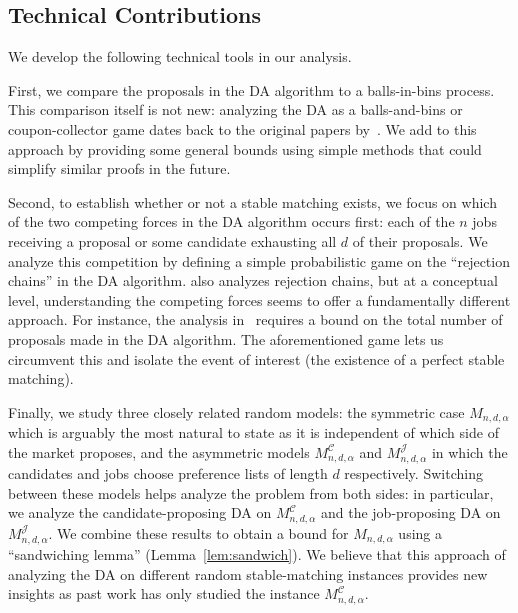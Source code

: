 \documentclass[11pt]{amsart}
\newcommand{\cal}[1]{\mathcal{#1}}
\begin{document}
\subsection{Technical Contributions} 
We develop the following technical tools in our analysis.  



 First, we compare the proposals in the DA algorithm to a balls-in-bins process. This comparison itself is not new: analyzing the DA as a balls-and-bins or coupon-collector game dates back to the original papers by~\cite{wilson1972analysis, knuth1976mariages}. We add to this approach by providing some general bounds using simple methods that could simplify similar proofs in the future.

 Second, to establish whether or not a stable matching exists, we focus on which of the two competing forces in the DA algorithm occurs first:  each of the $n$ jobs receiving a proposal or some candidate exhausting all $d$ of their proposals. We analyze this competition by defining a simple probabilistic game on the ``rejection chains'' in the DA algorithm. \cite{kanoria2021matching} also analyzes rejection chains, but at a conceptual level, understanding the competing forces seems to offer a fundamentally different approach. For instance, the analysis in~\cite{kanoria2021matching} requires a bound on the total number of proposals made in the DA algorithm. The aforementioned game lets us circumvent this and isolate the event of interest (the existence of a perfect stable matching).
 
 
Finally, we study three closely related random models: the symmetric case $M_{n, d, \alpha}$ which is arguably the most natural to state as it is independent of which side of the market proposes,  
 and the asymmetric models $M_{n, d, \alpha}^{\cal{C}}$ and $M_{n, d, \alpha}^{\cal{J}}$ in which the candidates and jobs choose preference lists of length $d$ respectively.  Switching between these models helps analyze the problem from both sides: in particular, we analyze the candidate-proposing DA on $M_{n, d, \alpha}^{\cal{C}}$ and the job-proposing DA on $M_{n, d, \alpha}^{\cal{J}}$.  We combine these results to obtain a bound for $M_{n, d, \alpha}$  using a ``sandwiching lemma'' (Lemma~\ref{lem:sandwich}).  We believe that this approach of analyzing the DA on different random stable-matching instances provides new insights as past work has only studied the instance $M_{n, d, \alpha}^{\cal{C}}$.


 
\end{document}
